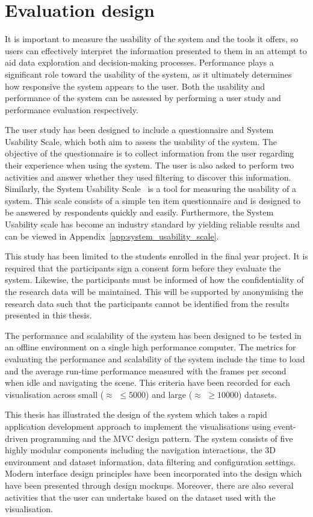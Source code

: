 \section{Evaluation design} {
\label{sec:evaluation_design}

	It is important to measure the usability of the system and the tools it offers, so users can effectively interpret the information presented to them in an attempt to aid data exploration and decision-making processes. Performance plays a significant role toward the usability of the system, as it ultimately determines how responsive the system appears to the user. Both the usability and performance of the system can be assessed by performing a user study and performance evaluation respectively.

	The user study has been designed to include a questionnaire and System Usability Scale, which both aim to assess the usability of the system. The objective of the questionnaire is to collect information from the user regarding their experience when using the system. The user is also asked to perform two activities and answer whether they used filtering to discover this information. Similarly, the System Usability Scale~\parencite{brooke1996sus} is a tool for measuring the usability of a system. This scale consists of a simple ten item questionnaire and is designed to be answered by respondents quickly and easily. Furthermore, the System Usability scale has become an industry standard by yielding reliable results and can be viewed in Appendix~\ref{app:system_usability_scale}.

	This study has been limited to the students enrolled in the final year project. It is required that the participants sign a consent form before they evaluate the system. Likewise, the participants must be informed of how the confidentiality of the research data will be maintained. This will be supported by anonymising the research data such that the participants cannot be identified from the results presented in this thesis.

	The performance and scalability of the system has been designed to be tested in an offline environment on a single high performance computer. The metrics for evaluating the performance and scalability of the system include the time to load and the average run-time performance measured with the frames per second when idle and navigating the scene. This criteria have been recorded for each visualisation across small ($\approx$ $\le5000$) and large ($\approx$ $\ge10000$) datasets.


}

This thesis has illustrated the design of the system which takes a rapid application development approach to implement the visualisations using event-driven programming and the MVC design pattern. The system consists of five highly modular components including the navigation interactions, the 3D environment and dataset information, data filtering and configuration settings. Modern interface design principles have been incorporated into the design which have been presented through design mockups. Moreover, there are also several activities that the user can undertake based on the dataset used with the visualisation.
